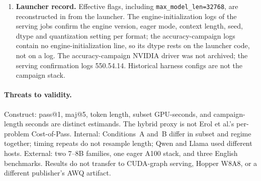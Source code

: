 \documentclass[11pt,a4paper]{article}
\begin{document}
\begin{enumerate}
    \item \textbf{Launcher record.} Effective flags, including \texttt{max\_model\_len=32768}, are reconstructed in  from the launcher. The engine-initialization logs of the serving jobs confirm the engine version, eager mode, context length, seed, dtype and quantization setting per format; the accuracy-campaign logs contain no engine-initialization line, so its dtype rests on the launcher code, not on a log. The accuracy-campaign NVIDIA driver was not archived; the serving confirmation logs 550.54.14. Historical harness configs are not the campaign stack.
\end{enumerate}

\paragraph{Threats to validity.}
Construct: pass@1, maj@5, token length, subset GPU-seconds, and campaign-length seconds are distinct estimands. The hybrid proxy is not Erol et al.'s per-problem Cost-of-Pass. Internal: Conditions~A and~B differ in subset and regime together; timing repeats do not resample length; Qwen and Llama used different hosts. External: two 7--8B families, one eager A100 stack, and three English benchmarks. Results do not transfer to CUDA-graph serving, Hopper W8A8, or a different publisher's AWQ artifact.
\end{document}
